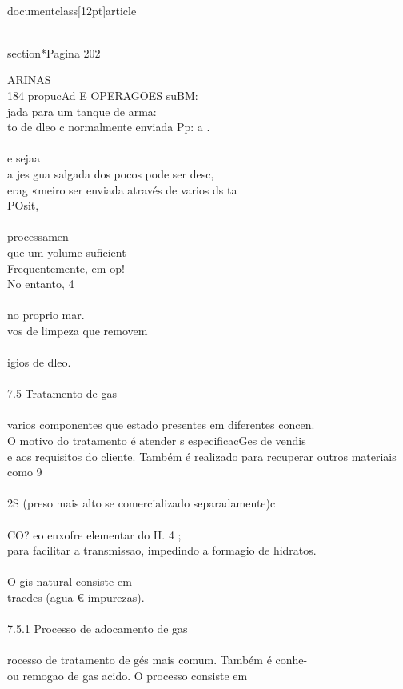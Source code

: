 \\documentclass[12pt]{article}
\begin{document}
\\section*{Pagina 202}

ARINAS\\
184 propucAd E OPERAGOES suBM:\\
jada para um tanque de arma:\\
to de dleo ¢ normalmente enviada Pp: a .\\
\\
e sejaa\\
a jes gua salgada dos pocos pode ser desc,\\
erag «meiro ser enviada através de varios ds ta\\
POsit,\\
\\
processamen|\\
que um yolume suficient\\
Frequentemente, em op!\\
No entanto, 4\\
\\
no proprio mar.\\
vos de limpeza que removem\\
\\
igios de dleo.\\
\\
7.5 Tratamento de gas\\
\\
varios componentes que estado presentes em diferentes concen.\\
O motivo do tratamento é atender s especificacGes de vendis\\
e aos requisitos do cliente. Também é realizado para recuperar outros materiais como 9\\
\\
2S (preso mais alto se comercializado separadamente)¢\\
\\
CO? eo enxofre elementar do H. 4 ;\\
para facilitar a transmissao, impedindo a formagio de hidratos.\\
\\
O gis natural consiste em\\
tracdes (agua € impurezas).\\
\\
7.5.1 Processo de adocamento de gas\\
\\
rocesso de tratamento de gés mais comum. Também é conhe-\\
ou remogao de gas acido. O processo consiste em\\
\end{document}

